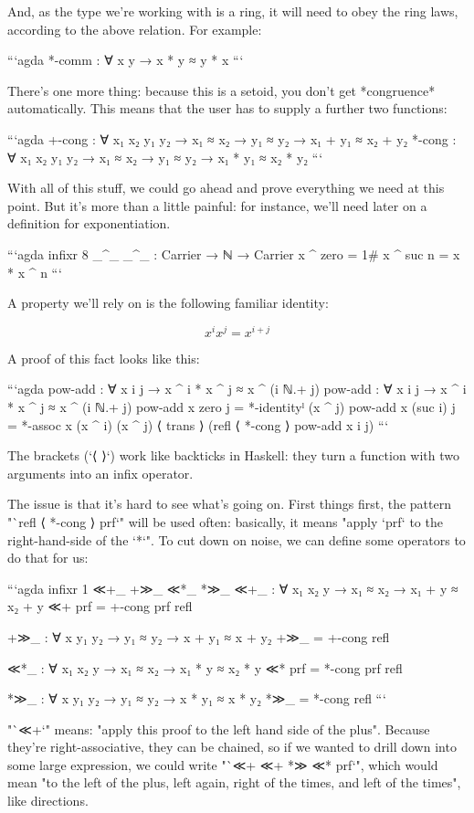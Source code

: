 \documentclass{article}
\begin{document}
And, as the type we're working with is a ring, it will need to obey the ring
laws, according to the above relation. For example:

```agda
*-comm : ∀ x y → x * y ≈ y * x
```

There's one more thing: because this is a setoid, you don't get *congruence*
automatically. This means that the user has to supply a further two functions:

```agda
+-cong : ∀ {x₁ x₂ y₁ y₂} → x₁ ≈ x₂ → y₁ ≈ y₂ → x₁ + y₁ ≈ x₂ + y₂
*-cong : ∀ {x₁ x₂ y₁ y₂} → x₁ ≈ x₂ → y₁ ≈ y₂ → x₁ * y₁ ≈ x₂ * y₂
```

With all of this stuff, we could go ahead and prove everything we need at this
point. But it's more than a little painful: for instance, we'll need later on a
definition for exponentiation.

```agda
infixr 8 _^_
_^_ : Carrier → ℕ → Carrier
x ^ zero = 1#
x ^ suc n = x * x ^ n
```

A property we'll rely on is the following familiar identity:

$$ x^i x^j = x^{i + j} $$

A proof of this fact looks like this:

```agda
pow-add : ∀ x i j
        → x ^ i * x ^ j ≈ x ^ (i ℕ.+ j)
pow-add : ∀ x i j → x ^ i * x ^ j ≈ x ^ (i ℕ.+ j)
pow-add x zero j = *-identityˡ (x ^ j)
pow-add x (suc i) j =
  *-assoc x (x ^ i) (x ^ j)
    ⟨ trans ⟩
  (refl ⟨ *-cong ⟩ pow-add x i j)
```

The brackets (`⟨ ⟩`) work like backticks in Haskell: they turn a function with
two arguments into an infix operator.

The issue is that it's hard to see what's going on. First things first, the
pattern "`refl ⟨ *-cong ⟩ prf`" will be used often: basically, it means "apply
`prf` to the right-hand-side of the `*`". To cut down on noise, we can define
some operators to do that for us:

```agda
infixr 1 ≪+_ +≫_ ≪*_ *≫_
≪+_ : ∀ {x₁ x₂ y} → x₁ ≈ x₂ → x₁ + y ≈ x₂ + y
≪+ prf = +-cong prf refl

+≫_ : ∀ {x y₁ y₂} → y₁ ≈ y₂ → x + y₁ ≈ x + y₂
+≫_ = +-cong refl

≪*_ : ∀ {x₁ x₂ y} → x₁ ≈ x₂ → x₁ * y ≈ x₂ * y
≪* prf = *-cong prf refl

*≫_ : ∀ {x y₁ y₂} → y₁ ≈ y₂ → x * y₁ ≈ x * y₂
*≫_ = *-cong refl
```

"`≪+`" means: "apply this proof to the left hand side of the plus". Because
they're right-associative, they can be chained, so if we wanted to drill down
into some large expression, we could write "`≪+ ≪+ *≫ ≪* prf`", which would mean
"to the left of the plus, left again, right of the times, and left of the
times", like directions.
\end{document}

